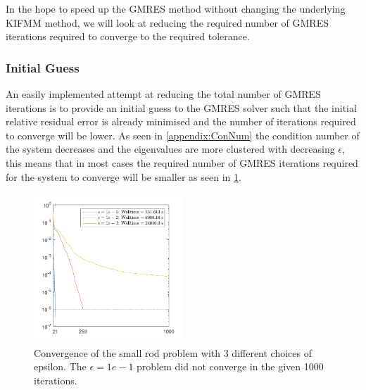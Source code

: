 In the hope to speed up the GMRES method without changing the underlying KIFMM method, we will look at reducing the required number of GMRES iterations required to converge to the required tolerance.

\subsubsection{Initial Guess}\label{sec:Guess}

An easily implemented attempt at reducing the total number of GMRES iterations is to provide an initial guess to the GMRES solver such that the initial relative residual error is already minimised and the number of iterations required to converge will be lower. As seen in \cref{appendix:ConNum} the condition number of the system decreases and the eigenvalues are more clustered with decreasing $\epsilon$, this means that in most cases the required number of GMRES iterations required for the system to converge will be smaller as seen in \cref{fig:InitalGuessEPS}.
\begin{figure}[ht]
    \centering
    \includegraphics[width=0.5\textwidth]{Images/InitalGuessEPS.pdf}
    \caption{Convergence of the small rod problem with 3 different choices of epsilon. The $\epsilon = 1e-1$ problem did not converge in the given 1000 iterations.}
    \label{fig:InitalGuessEPS}
\end{figure}
